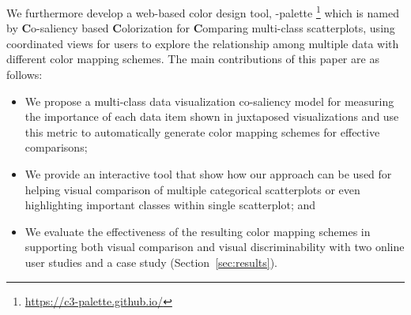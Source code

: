 We furthermore develop a web-based color design tool, \toolname-palette \footnote{\small \url{https://c3-palette.github.io/}} which is named by \textbf{C}o-saliency based \textbf{C}olorization for \textbf{C}omparing multi-class scatterplots, using coordinated views for users to explore the relationship among multiple data with different color mapping schemes. %
The main contributions of this paper are as follows:
\begin{itemize}[noitemsep]
\setlength{\itemsep}{5pt}
  \item We propose a multi-class data visualization co-saliency model for measuring the importance of each data item shown in juxtaposed visualizations and use this metric to automatically generate color mapping schemes for effective comparisons;
    \item
  We provide an interactive tool that show how our approach can be used for helping visual comparison of multiple categorical scatterplots or even highlighting important classes within single scatterplot; and
  \item
   We evaluate the effectiveness of the resulting color mapping schemes in supporting both visual comparison and visual discriminability with two online user studies and a case study (Section~\ref{sec:results}).

\end{itemize}

